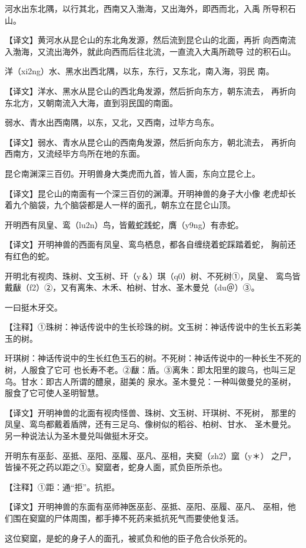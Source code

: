 \documentclass[a4paper,12pt,UTF8,twoside]{ctexbook}
\begin{document}
河水出东北隅，以行其北，西南又入渤海，又出海外，即西而北，入禹 所导积石山。

【译文】黄河水从昆仑山的东北角发源，然后流到昆仑山的北面，再折 向西南流入渤海，又流出海外，就此向西而后往北流，一直流入大禹所疏导 过的积石山。

洋（xi2ng）水、黑水出西北隅，以东，东行，又东北，南入海，羽民 南。

【译文】洋水、黑水从昆仑山的西北角发源，然后折向东方，朝东流去， 再折向东北方，又朝南流入大海，直到羽民国的南面。

弱水、青水出西南隅，以东，又北，又西南，过毕方鸟东。

【译文】弱水、青水从昆仑山的西南角发源，然后折向东方，朝北流去， 再折向西南方，又流经毕方鸟所在地的东面。

昆仑南渊深三百仞。开明兽身大类虎而九首，皆人面，东向立昆仑上。

【译文】昆仑山的南面有一个深三百仞的渊潭。开明神兽的身子大小像 老虎却长着九个脑袋，九个脑袋都是人一样的面孔，朝东立在昆仑山顶。

开明西有凤皇、鸾（lu2n）鸟，皆戴蛇践蛇，膺（y9ng）有赤蛇。

【译文】开明神兽的西面有凤皇、鸾鸟栖息，都各自缠绕着蛇踩踏着蛇， 胸前还有红色的蛇。

开明北有视肉、珠树、文玉树、玕（y＆）琪（q0）树、不死树①，凤皇、 鸾鸟皆戴瞂（f2）②，又有离朱、木禾、柏树、甘水、圣木曼兑（du＠）③。

一曰挺木牙交。

【注释】①珠树：神话传说中的生长珍珠的树。文玉树：神话传说中的生长五彩美玉的树。

玕琪树：神话传说中的生长红色玉石的树。不死树：神话传说中的一种长生不死的树，人服食了它可 也长寿不老。②瞂：盾。③离朱：即太阳里的踆乌，也叫三足乌。甘水：即古人所谓的醴泉，甜美的 泉水。圣木曼兑：一种叫做曼兑的圣树，服食了它可使人圣明智慧。

【译文】开明神兽的北面有视肉怪兽、珠树、文玉树、玕琪树、不死树， 那里的凤皇、鸾鸟都戴着盾牌，还有三足乌、像树似的稻谷、柏树、甘水、 圣木曼兑。另一种说法认为圣木曼兑叫做挺木牙交。

开明东有巫彭、巫抵、巫阳、巫履、巫凡、巫相，夹窫（zh2）窳（y＊） 之尸，皆操不死之药以距之①。窫窳者，蛇身人面，贰负臣所杀也。

【注释】①距：通“拒”。抗拒。

【译文】开明神兽的东面有巫师神医巫彭、巫抵、巫阳、巫履、巫凡、 巫相，他们围在窫窳的尸体周围，都手捧不死药来抵抗死气而要使他复活。

这位窫窳，是蛇的身子人的面孔，被贰负和他的臣子危合伙杀死的。
\end{document}
